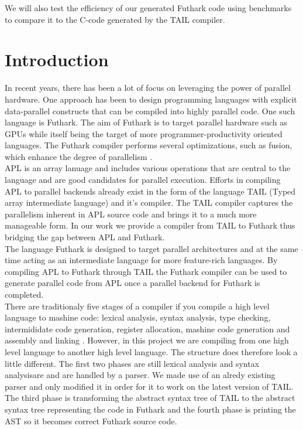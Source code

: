 \documentclass[11pt]{article}
\begin{document}
We will also test the efficiency of our generated Futhark code using benchmarks to compare it to the C-code generated by the TAIL compiler. 


\newpage

\section{Introduction}

In recent years, there has been a lot of focus on leveraging the power of parallel hardware. 
One approach has been to design programming languages with explicit data-parallel constructs that can be compiled 
into highly parallel code. One such language is Futhark. The aim of Futhark is to target parallel hardware such as 
GPUs while itself being the target of more programmer-productivity oriented languages. The Futhark compiler 
performs several optimizations, such as fusion, which enhance the degree of 
parallelism \cite{T.Henriksen&C.Oancea}.\\

APL is an array lanuage and includes various operations that are central to the language and are good candidates 
for parallel execution. Efforts in compiling APL to parallel backends already exist in the form of the language 
TAIL (Typed array intermediate language) and it’s compiler. The TAIL compiler captures the parallelism inherent in 
APL source code and brings it to a much more manageable form. In our work we provide a compiler from TAIL 
to Futhark thus bridging the gap between APL and Futhark.\\

The language Futhark is designed to target parallel architectures and at the same time acting 
as an intermediate language for more feature-rich languages. By compiling APL to Futhark through TAIL the 
Futhark compiler can be used to generate parallel code from APL once a parallel backend for 
Futhark is completed.\\

There are traditionaly five stages of a compiler if you compile a high level language to mashine code: 
lexical analysis, syntax analysis, type checking, intermididate code generation, register allocation, mashine 
code generation and assembly and linking \cite{TorbenMogensen}. However, in this project we are compiling from 
one high level language to another high level language. The structure does therefore look a little different. 
The first two phases are still lexical analysis and syntax analysisare and are handled by a parser. We made use of an alredy existing parser \cite{APLACC} and only modified it in order for it to work on the latest 
version of TAIL. The third phase is transforming the abstract syntax tree of TAIL to the abstract syntax tree 
representing the code in Futhark and the fourth phase is printing the AST so it becomes correct 
Futhark source code. \\
\end{document}
